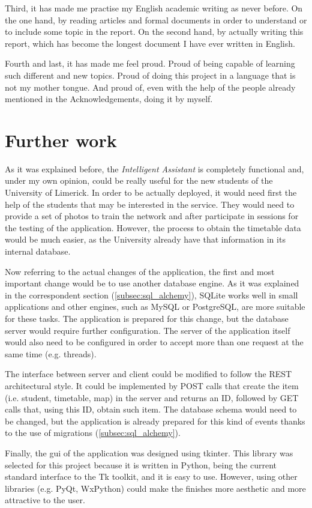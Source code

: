 Third, it has made me practise my English academic writing as never before. On the one hand, by reading articles and formal documents in order to understand or to include some topic in the report. On the second hand, by actually writing this report, which has become the longest document I have ever written in English. 

Fourth and last, it has made me feel proud. Proud of being capable of learning such different and new topics. Proud of doing this project in a language that is not my mother tongue. And proud of, even with the help of the people already mentioned in the Acknowledgements, doing it by myself.

\section{Further work}
As it was explained before, the \textit{Intelligent Assistant} is completely functional and, under my own opinion, could be really useful for the new students of the University of Limerick. In order to be actually deployed, it would need first the help of the students that may be interested in the service. They would need to provide a set of photos to train the network and after participate in sessions for the testing of the application. However, the process to obtain the timetable data would be much easier, as the University already have that information in its internal database.

Now referring to the actual changes of the application, the first and most important change would be to use another database engine. As it was explained in the correspondent section (\ref{subsec:sql_alchemy}), SQLite works well in small applications and other engines, such as MySQL or PostgreSQL, are more suitable for these tasks. The application is prepared for this change, but the database server would require further configuration. The server of the application itself would also need to be configured in order to accept more than one request at the same time (e.g. threads).

The interface between server and client could be modified to follow the REST architectural style. It could be implemented by POST calls that create the item (i.e. student, timetable, map) in the server and returns an ID, followed by GET calls that, using this ID, obtain such item. The database schema would need to be changed, but the application is already prepared for this kind of events thanks to the use of migrations (\ref{subsec:sql_alchemy}).

Finally, the \gls{gui} of the application was designed using tkinter. This library was selected for this project because it is written in Python, being the current standard interface to the Tk toolkit, and it is easy to use. However, using other libraries (e.g. PyQt, WxPython) could make the finishes more aesthetic and more attractive to the user.